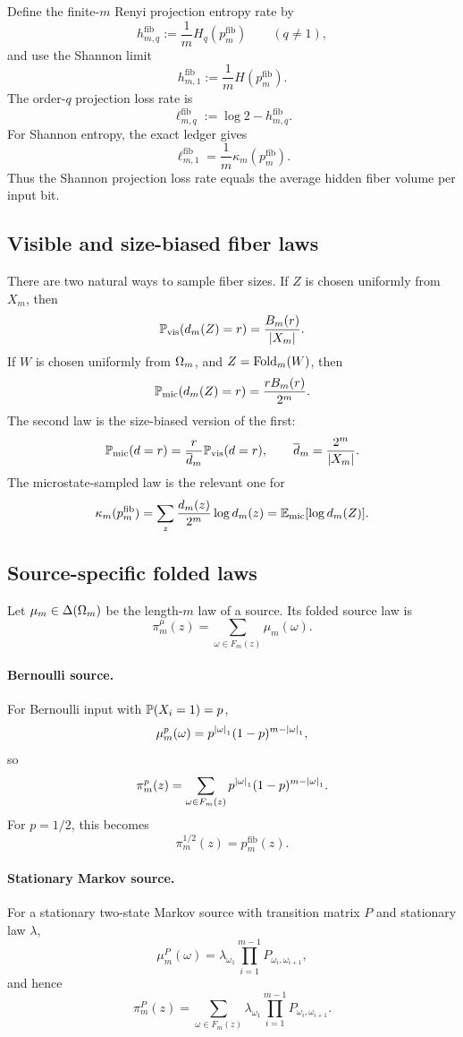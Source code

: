 Define the finite-\(m\) Renyi projection entropy rate by
\[
h_{m,q}^{\mathrm{fib}}:=\frac1m H_q(p_m^{\mathrm{fib}})
\qquad(q\ne1),
\]
and use the Shannon limit
\[
h_{m,1}^{\mathrm{fib}}:=\frac1m H(p_m^{\mathrm{fib}}).
\]
The order-\(q\) projection loss rate is
\[
\ell_{m,q}^{\mathrm{fib}}:=\log2-h_{m,q}^{\mathrm{fib}}.
\]
For Shannon entropy, the exact ledger gives
\[
\boxed{
\ell_{m,1}^{\mathrm{fib}}
=
\frac1m\kappa_m(p_m^{\mathrm{fib}}).
}
\]
Thus the Shannon projection loss rate equals the average hidden fiber volume per input bit.

\subsection{Visible and size-biased fiber laws}

There are two natural ways to sample fiber sizes.  If \(Z\) is chosen uniformly from \(X_m\), then
\[
\mathbb{P}_{\mathrm{vis}}(d_m(Z)=r)=\frac{B_m(r)}{\left|X_m\right|}.
\]
If \(W\) is chosen uniformly from \(\Omega_m\), and \(Z=\operatorname{Fold}_m(W)\), then
\[
\mathbb{P}_{\mathrm{mic}}(d_m(Z)=r)=\frac{rB_m(r)}{2^m}.
\]
The second law is the size-biased version of the first:
\[
\mathbb{P}_{\mathrm{mic}}(d=r)
=
\frac{r}{\overline d_m}\mathbb{P}_{\mathrm{vis}}(d=r),
\qquad
\overline d_m=\frac{2^m}{\left|X_m\right|}.
\]
The microstate-sampled law is the relevant one for
\[
\kappa_m(p_m^{\mathrm{fib}})
=
\sum_z\frac{d_m(z)}{2^m}\log d_m(z)
=
\mathbb{E}_{\mathrm{mic}}[\log d_m(Z)].
\]

\subsection{Source-specific folded laws}

Let \(\mu_m\in\Delta(\Omega_m)\) be the length-\(m\) law of a source.  Its folded source law is
\[
\pi_m^\mu(z)=\sum_{\omega\in F_m(z)}\mu_m(\omega).
\]

\paragraph{Bernoulli source.}
For Bernoulli input with \(\mathbb{P}(X_i=1)=p\),
\[
\mu_m^p(\omega)=p^{\left|\omega\right|_1}(1-p)^{m-\left|\omega\right|_1},
\]
so
\[
\pi_m^p(z)=
\sum_{\omega\in F_m(z)}
p^{\left|\omega\right|_1}(1-p)^{m-\left|\omega\right|_1}.
\]
For \(p=1/2\), this becomes
\[
\pi_m^{1/2}(z)=p_m^{\mathrm{fib}}(z).
\]

\paragraph{Stationary Markov source.}
For a stationary two-state Markov source with transition matrix \(P\) and stationary law \(\lambda\),
\[
\mu_m^P(\omega)=
\lambda_{\omega_1}\prod_{i=1}^{m-1}P_{\omega_i,\omega_{i+1}},
\]
and hence
\[
\pi_m^P(z)=
\sum_{\omega\in F_m(z)}
\lambda_{\omega_1}\prod_{i=1}^{m-1}P_{\omega_i,\omega_{i+1}}.
\]

